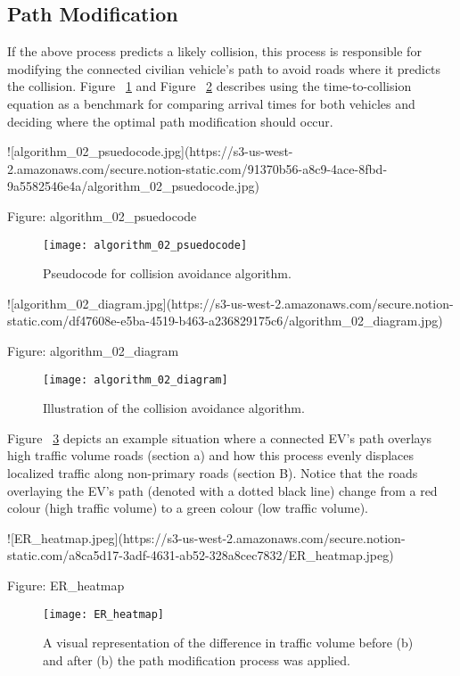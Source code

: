 \subsection{Path Modification}

If the above process predicts a likely collision, this process is responsible for modifying the connected civilian vehicle's path to avoid roads where it predicts the collision. Figure ~\ref{fig:algorithm_02_psuedocode} and Figure ~\ref{fig:algorithm_02_diagram} describes using the time-to-collision equation as a benchmark for comparing arrival times for both vehicles and deciding where the optimal path modification should occur.

![algorithm_02_psuedocode.jpg](https://s3-us-west-2.amazonaws.com/secure.notion-static.com/91370b56-a8c9-4ace-8fbd-9a5582546e4a/algorithm_02_psuedocode.jpg)

Figure: algorithm_02_psuedocode

\begin{figure}
\texttt{[image: algorithm\_02\_psuedocode]}
\caption{Pseudocode for collision avoidance algorithm.}
\label{fig:algorithm_02_psuedocode}
\end{figure}

![algorithm_02_diagram.jpg](https://s3-us-west-2.amazonaws.com/secure.notion-static.com/df47608e-e5ba-4519-b463-a236829175c6/algorithm_02_diagram.jpg)

Figure: algorithm_02_diagram

\begin{figure}
\texttt{[image: algorithm\_02\_diagram]}
\caption{Illustration of the collision avoidance algorithm.}
\label{fig:algorithm_02_diagram}
\end{figure}

Figure ~\ref{fig:ER_heatmap} depicts an example situation where a connected \acrshort{EV}'s path overlays high traffic volume roads (section a) and how this process evenly displaces localized traffic along non-primary roads (section B). Notice that the roads overlaying the \acrshort{EV}'s path (denoted with a dotted black line) change from a red colour (high traffic volume) to a green colour (low traffic volume).

![ER_heatmap.jpeg](https://s3-us-west-2.amazonaws.com/secure.notion-static.com/a8ca5d17-3adf-4631-ab52-328a8cec7832/ER_heatmap.jpeg)

Figure: ER_heatmap

\begin{figure}
\texttt{[image: ER\_heatmap]}
\caption{A visual representation of the difference in traffic volume before (b) and after (b) the path modification process was applied.}
\label{fig:ER_heatmap}
\end{figure}

